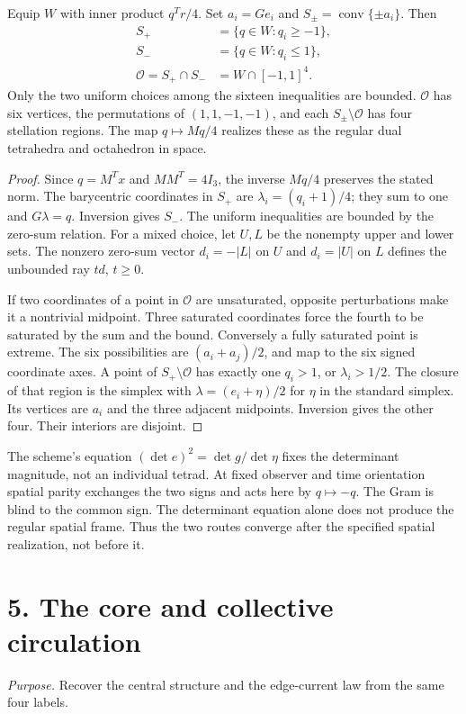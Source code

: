 \begin{theorem}\label{thm:solid}
Equip $W$ with inner product $q^Tr/4$. Set $a_i=Ge_i$ and $S_\pm=\operatorname{conv}\{\pm a_i\}$. Then
\begin{align}
 S_+&=\{q\in W:q_i\geq-1\},\\
 S_-&=\{q\in W:q_i\leq1\},\\
 \mathcal O=S_+\cap S_-&=W\cap[-1,1]^4.
\end{align}
Only the two uniform choices among the sixteen inequalities are bounded. $\mathcal O$ has six vertices, the permutations of $(1,1,-1,-1)$, and each $S_\pm\setminus\mathcal O$ has four stellation regions. The map $q\mapsto Mq/4$ realizes these as the regular dual tetrahedra and octahedron in space.
\end{theorem}
\begin{proof}
Since $q=M^Tx$ and $MM^T=4I_3$, the inverse $Mq/4$ preserves the stated norm. The barycentric coordinates in $S_+$ are $\lambda_i=(q_i+1)/4$; they sum to one and $G\lambda=q$. Inversion gives $S_-$. The uniform inequalities are bounded by the zero-sum relation. For a mixed choice, let $U,L$ be the nonempty upper and lower sets. The nonzero zero-sum vector $d_i=-|L|$ on $U$ and $d_i=|U|$ on $L$ defines the unbounded ray $td$, $t\geq0$.

If two coordinates of a point in $\mathcal O$ are unsaturated, opposite perturbations make it a nontrivial midpoint. Three saturated coordinates force the fourth to be saturated by the sum and the bound. Conversely a fully saturated point is extreme. The six possibilities are $(a_i+a_j)/2$, and map to the six signed coordinate axes. A point of $S_+\setminus\mathcal O$ has exactly one $q_i>1$, or $\lambda_i>1/2$. The closure of that region is the simplex with $\lambda=(e_i+\eta)/2$ for $\eta$ in the standard simplex. Its vertices are $a_i$ and the three adjacent midpoints. Inversion gives the other four. Their interiors are disjoint.
\end{proof}
The scheme's equation $(\det e)^2=\det g/\det\eta$ fixes the determinant magnitude, not an individual tetrad. At fixed observer and time orientation spatial parity exchanges the two signs and acts here by $q\mapsto-q$. The Gram is blind to the common sign. The determinant equation alone does not produce the regular spatial frame. Thus the two routes converge after the specified spatial realization, not before it.

\section*{5. The core and collective circulation}
\textit{Purpose.} Recover the central structure and the edge-current law from the same four labels.

